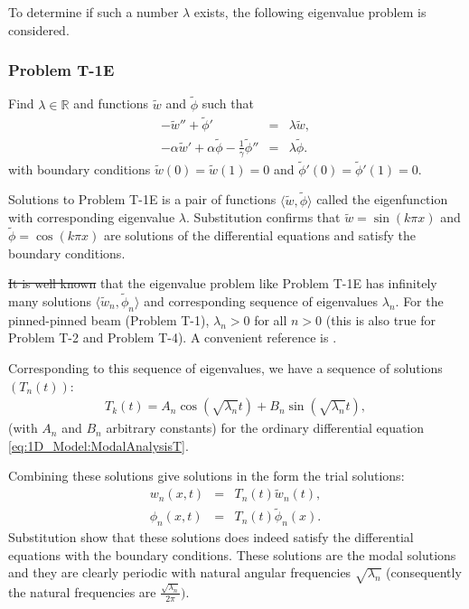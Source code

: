 \documentclass[../../main.tex]{subfiles}
\begin{document}
To determine if such a number $\lambda$ exists, the following eigenvalue problem is considered.

\subsubsection*{Problem T-1E}\label{sssec:1D_Model:Problem:T1E}
Find $\lambda \in \mathbb{R}$ and functions $\tilde{w}$ and $\tilde{\phi}$ such that
\begin{eqnarray*}
	-\tilde{w}'' + \tilde{\phi}' &=& \lambda \tilde{w}, \label{eq:1D_Model:ProblemT1E1}\\
	-\alpha \tilde{w}' + \alpha\tilde{\phi} - \frac{1}{\gamma}\tilde{\phi}'' &=& \lambda \tilde{\phi}. \label{eq:1D_Model:ProblemT1E2}
\end{eqnarray*} with boundary conditions $\tilde{w}(0) = \tilde{w}(1) = 0$ and $\tilde{\phi}'(0) = \tilde{\phi}'(1) = 0$.

Solutions to Problem T-1E is a pair of functions $\langle \tilde{w}, \tilde{\phi} \rangle$ called the eigenfunction with corresponding eigenvalue $\lambda$. Substitution confirms that $\tilde{w} = \sin(k\pi x)$ and $\tilde{\phi} = \cos(k \pi x)$ are solutions of the differential equations and satisfy the boundary conditions.

\sout{It is well known} that the eigenvalue problem like Problem T-1E has infinitely many solutions $\langle \tilde{w}_n, \tilde{\phi}_n \rangle$ and corresponding sequence of eigenvalues $\lambda_n$. For the pinned-pinned beam (Problem T-1), $\lambda_n > 0$ for all $n > 0$ (this is also true for Problem T-2 and Problem T-4). A convenient reference is \cite{VV06}.

Corresponding to this sequence of eigenvalues, we have a sequence of solutions $(T_n(t))$:
\begin{eqnarray}
	T_k(t)=A_n\cos(\sqrt{\lambda_n}t)+B_n\sin(\sqrt{\lambda_n}t), \label{eq:1D_Model:ModalAnalysisTn}
\end{eqnarray}
(with $A_n$ and $B_n$ arbitrary constants) for the ordinary differential equation \eqref{eq:1D_Model:ModalAnalysisT}.

Combining these solutions give solutions in the form the trial solutions:
\begin{eqnarray*}
	w_n(x,t) & = & T_n(t)\tilde{w}_n(t), \\
	\phi_n(x,t) & = & T_n(t)\tilde{\phi}_n(x).
\end{eqnarray*} 
Substitution show that these solutions does indeed satisfy the differential equations with the boundary conditions. These solutions are the modal solutions and they are clearly periodic with natural angular frequencies $\sqrt{\lambda_n}$ (consequently the natural frequencies are $\frac{\sqrt{\lambda_n}}{2 \pi})$.
\end{document}
